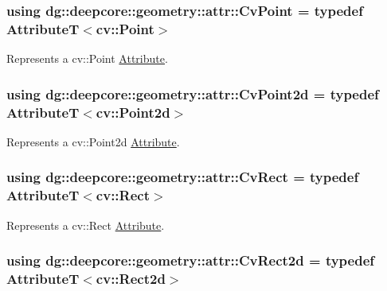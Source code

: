 \subsubsection[{\texorpdfstring{Cv\+Point}{CvPoint}}]{\setlength{\rightskip}{0pt plus 5cm}using {\bf dg\+::deepcore\+::geometry\+::attr\+::\+Cv\+Point} = typedef AttributeT$<$cv\+::\+Point$>$}\hypertarget{group___geometry_attributes_ga01f1670ca2631504526d8a31da2c2dab}{}\label{group___geometry_attributes_ga01f1670ca2631504526d8a31da2c2dab}


Represents a {\ttfamily cv\+::\+Point} \hyperlink{classdg_1_1deepcore_1_1_attribute}{Attribute}. 

\subsubsection[{\texorpdfstring{Cv\+Point2d}{CvPoint2d}}]{\setlength{\rightskip}{0pt plus 5cm}using {\bf dg\+::deepcore\+::geometry\+::attr\+::\+Cv\+Point2d} = typedef AttributeT$<$cv\+::\+Point2d$>$}\hypertarget{group___geometry_attributes_ga5bf440b90d7f88552975a2ef0a793b29}{}\label{group___geometry_attributes_ga5bf440b90d7f88552975a2ef0a793b29}


Represents a {\ttfamily cv\+::\+Point2d} \hyperlink{classdg_1_1deepcore_1_1_attribute}{Attribute}. 

\subsubsection[{\texorpdfstring{Cv\+Rect}{CvRect}}]{\setlength{\rightskip}{0pt plus 5cm}using {\bf dg\+::deepcore\+::geometry\+::attr\+::\+Cv\+Rect} = typedef AttributeT$<$cv\+::\+Rect$>$}\hypertarget{group___geometry_attributes_gaf468cd05b887ecf25a5cc5987699b696}{}\label{group___geometry_attributes_gaf468cd05b887ecf25a5cc5987699b696}


Represents a {\ttfamily cv\+::\+Rect} \hyperlink{classdg_1_1deepcore_1_1_attribute}{Attribute}. 

\subsubsection[{\texorpdfstring{Cv\+Rect2d}{CvRect2d}}]{\setlength{\rightskip}{0pt plus 5cm}using {\bf dg\+::deepcore\+::geometry\+::attr\+::\+Cv\+Rect2d} = typedef AttributeT$<$cv\+::\+Rect2d$>$}\hypertarget{group___geometry_attributes_ga27ad4b2d4055276ed4b3c849d0d8752f}{}\label{group___geometry_attributes_ga27ad4b2d4055276ed4b3c849d0d8752f}


